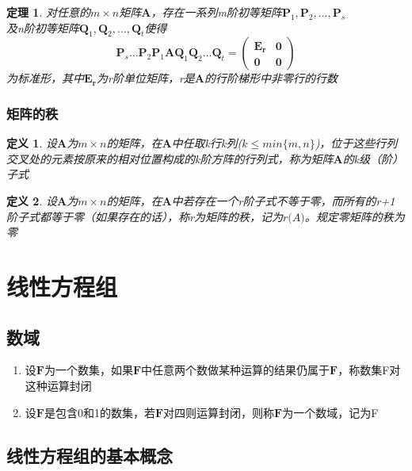 \documentclass[a4paper]{ctexbook}
\newtheorem{definition}{定义}[section]
\newtheorem{theorem}[section]{定理}
\begin{document}
\begin{theorem}
    对任意的\(m\times n\)矩阵\(\mathbf{A}\)，存在一系列m阶初等矩阵\(\mathbf{P}_1,\mathbf{P}_2,\dots,\mathbf{P}_s\)
    \\及n阶初等矩阵\(\mathbf{Q}_1,\mathbf{Q}_2,\dots,\mathbf{Q}_t\)使得
    \[\mathbf{P}_s\dots \mathbf{P}_2\mathbf{P}_1\mathbf{A}\mathbf{Q}_1\mathbf{Q}_2\dots\mathbf{Q}_t
    =\begin{pmatrix}
        \mathbf{E_r}&\mathbf{0}
        \\ \mathbf{0}&\mathbf{0}
    \end{pmatrix}\]
    为标准形，其中\(\mathbf{E_r}\)为r阶单位矩阵，r是\(\mathbf{A}\)的行阶梯形中非零行的行数
\end{theorem}

\section{矩阵的秩}
\begin{definition}
    设\(\mathbf{A}\)为\(m \times n\)的矩阵，在\(\mathbf{A}\)中任取k行k列(\(k\leq min\{m,n\}\))，位于这些行列交叉处的元素按原来的相对位置构成的k阶方阵的行列式，称为矩阵\(\mathbf{A}\)的k级（阶）子式
\end{definition}
\begin{definition}
    设\(\mathbf{A}\)为\(m \times n\)的矩阵，在\(\mathbf{A}\)中若存在一个r阶子式不等于零，而所有的r+1阶子式都等于零（如果存在的话），称r为矩阵的秩，记为\(r\mathbf(A)\)。规定零矩阵的秩为零
\end{definition}

\part{线性方程组}
\chapter{数域}
\begin{enumerate}
    \item 设\(\mathbf{F}\)为一个数集，如果\(\mathbf{F}\)中任意两个数做某种运算的结果仍属于\(\mathbf{F}\)，称数集F对这种运算封闭
    \item 设\(\mathbf{F}\)是包含0和1的数集，若\(\mathbf{F}\)对四则运算封闭，则称\(\mathbf{F}\)为一个数域，记为F
\end{enumerate}
\chapter{线性方程组的基本概念}
\end{document}
